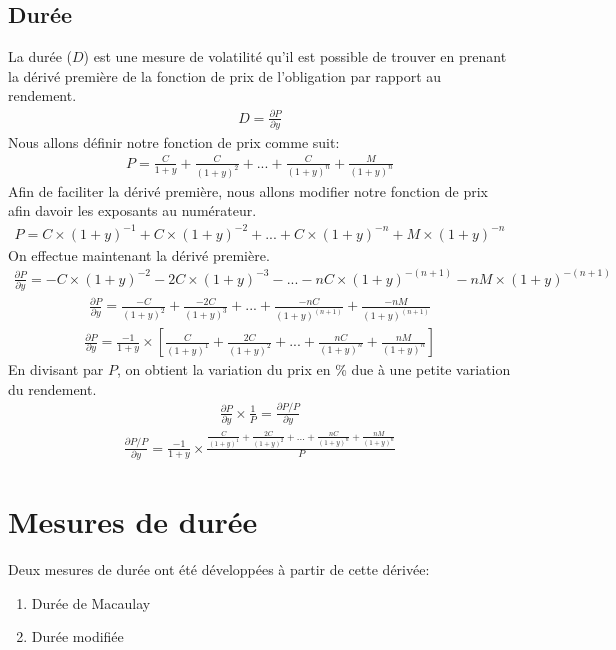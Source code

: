 \documentclass[letterpaper, 12pt]{article}
\newcommand{\1}{\mathds{1}}	%
\theoremstyle{definition}
\begin{document}
\subsection{Durée}
La durée ($D$) est une mesure de volatilité qu'il est possible de trouver en prenant la dérivé première de  la fonction de prix de l'obligation par rapport au rendement. 
\begin{align*}
D=\frac{\partial P}{\partial y}
\end{align*}
Nous allons définir notre fonction de prix comme suit:
\begin{align*}
P=\frac{C}{1+y}+\frac{C}{(1+y)^2}+...+\frac{C}{(1+y)^n}+\frac{M}{(1+y)^n}
\end{align*}
Afin de faciliter la dérivé première, nous allons modifier notre fonction de prix afin davoir les exposants au numérateur.
\begin{align*}
P=C \times (1+y)^{-1}+C \times (1+y)^{-2}+...+C \times (1+y)^{-n}+M \times (1+y)^{-n}
\end{align*}
On effectue maintenant la dérivé première.
\begin{align*}
\frac{\partial P}{\partial y}=-C \times (1+y)^{-2}-2C \times (1+y)^{-3}-...-nC \times (1+y)^{-(n+1)}-nM \times (1+y)^{-(n+1)}
\end{align*}
\begin{align*}
\frac{\partial P}{\partial y}=\frac{-C}{(1+y)^2}+\frac{-2C}{(1+y)^3}+...+\frac{-nC}{(1+y)^{(n+1)}}+\frac{-nM}{(1+y)^{(n+1)}}
\end{align*}
\begin{align*}
\frac{\partial P}{\partial y}= \frac{-1}{1+y} \times \left[ \frac{C}{(1+y)^1}+\frac{2C}{(1+y)^2}+...+\frac{nC}{(1+y)^{n}}+\frac{nM}{(1+y)^{n}} \right]
\end{align*}
En divisant par $P$, on obtient la variation du prix en \% due à une petite variation du rendement.
\begin{align*}
\frac{\partial P}{\partial y} \times \frac{1}{P}=\frac{\partial P/P}{\partial y} 
\end{align*}
\begin{align*}
\frac{\partial P/P}{\partial y} = \frac{-1}{1+y} \times \frac{\frac{C}{(1+y)^1}+\frac{2C}{(1+y)^2}+...+\frac{nC}{(1+y)^{n}}+\frac{nM}{(1+y)^{n}}}{P}
\end{align*}
\section{Mesures de durée}
Deux mesures de durée ont été développées à partir de cette dérivée: 
\begin{enumerate}
\item Durée de Macaulay
\item Durée modifiée
\end{enumerate}
\end{document}
